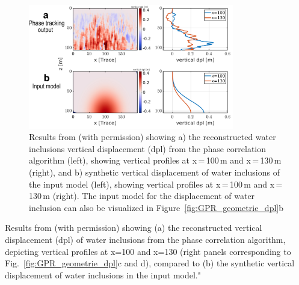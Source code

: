 \begin{figure}[h]
    \centering
    \includegraphics[width=0.8\textwidth]{chapters/Discussion/GPR_dpl_phase.pdf}
    \caption{Results from \cite{Aichele&al2024} (with permission) showing a) the reconstructed water inclusions vertical displacement (dpl) from the phase correlation algorithm (left), showing vertical profiles at x\,=\,100\,m and x\,=\,130\,m (right), and b) synthetic vertical displacement of water inclusions of the input model (left), showing vertical profiles at x\,=\,100\,m and x\,=\,130\,m (right). The input model for the displacement of water inclusion can also be visualized in Figure~\ref{fig:GPR_geometrie_dpl}b}
    \label{fig:GPR_phase}
\end{figure}

Results from \cite{Aichele&al2024} (with permission) showing (a) the reconstructed vertical displacement (dpl) of water inclusions from the phase correlation algorithm, depicting vertical profiles at x=100 and x=130 (right panels corresponding to Fig.~\ref{fig:GPR_geometrie_dpl}c and d), compared to (b) the synthetic vertical displacement of water inclusions in the input model."

